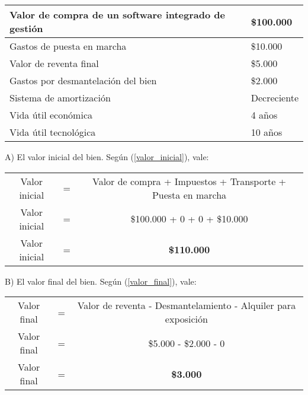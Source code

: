 \documentclass[12pt,a4paper]{article}
\begin{document}
        \begin{table}[H]
        \centering
        	\begin{tabular}{ | l | l | }
            	\hline
            	Valor de compra de un software integrado de gestión		&	\$100.000	\\ \hline
                Gastos de puesta en marcha								&	\$10.000	\\ \hline
                Valor de reventa final									&	\$5.000		\\ \hline
                Gastos por desmantelación del bien						&	\$2.000		\\ \hline
                Sistema de amortización									&	Decreciente	\\ \hline
                Vida útil económica										&	4 años		\\ \hline
                Vida útil tecnológica									&	10 años		\\ \hline
			\end{tabular}
		\end{table}
        
        A) El valor inicial del bien. Según (\ref{valor_inicial}), vale:

		\begin{table}[H]
		\centering
        	\begin{tabular}{ c c c }
            	Valor inicial	&=&		Valor de compra + Impuestos + Transporte + Puesta en marcha \\
                Valor inicial	&=&		\$100.000 + 0 + 0 + \$10.000 \\
                Valor inicial	&=&		\textbf{\$110.000}
			\end{tabular}
		\end{table}
        
        \hrulefill
        
        B) El valor final del bien. Según (\ref{valor_final}), vale:

		\begin{table}[H]
		\centering
        	\begin{tabular}{ c c c }
            	Valor final	&=&		Valor de reventa - Desmantelamiento - Alquiler para exposición \\
                Valor final	&=&		\$5.000 - \$2.000 - 0 \\
                Valor final	&=&		\textbf{\$3.000}
			\end{tabular}
		\end{table}
        
\end{document}
